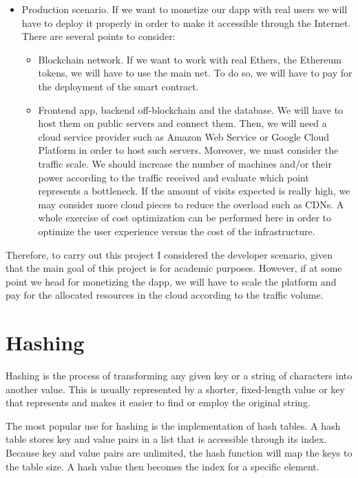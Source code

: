 \documentclass[a4paper,12pt]{article}
\begin{document}
\begin{appendices}
{\begin{itemize}
    \item Production scenario. If we want to monetize our dapp with real users we will have to deploy it properly in order to make it accessible through the Internet. There are several points to consider:
    \begin{itemize}
        \item Blockchain network. If we want to work with real Ethers, the Ethereum tokens, we will have to use the main net. To do so, we will have to pay for the deployment of the smart contract.
        \item Frontend app, backend off-blockchain and the database. We will have to host them on public servers and connect them. Then, we will need a cloud service provider such as Amazon Web Service\cite{aws} or Google Cloud Platform\cite{gcp} in order to host such servers. Moreover, we must consider the traffic scale. We should increase the number of machines and/or their power according to the traffic received and evaluate which point represents a bottleneck. If the amount of visits expected is really high, we may consider more cloud pieces to reduce the overload such as CDNs. A whole exercise of cost optimization can be performed here in order to optimize the user experience versus the cost of the infrastructure.
    \end{itemize}
\end{itemize}
{Therefore, to carry out this project I considered the developer scenario, given that the main goal of this project is for academic purposes. However, if at some point we head for monetizing the dapp, we will have to scale the platform and pay for the allocated resources in the cloud according to the traffic volume.}
}

\section{Hashing}
\label{appendix:hashing}
{Hashing is the process of transforming any given key or a string of characters into another value. This is usually represented by a shorter, fixed-length value or key that represents and makes it easier to find or employ the original string.

The most popular use for hashing is the implementation of hash tables. A hash table stores key and value pairs in a list that is accessible through its index. Because key and value pairs are unlimited, the hash function will map the keys to the table size. A hash value then becomes the index for a specific element.

}
\end{appendices}
\end{document}
